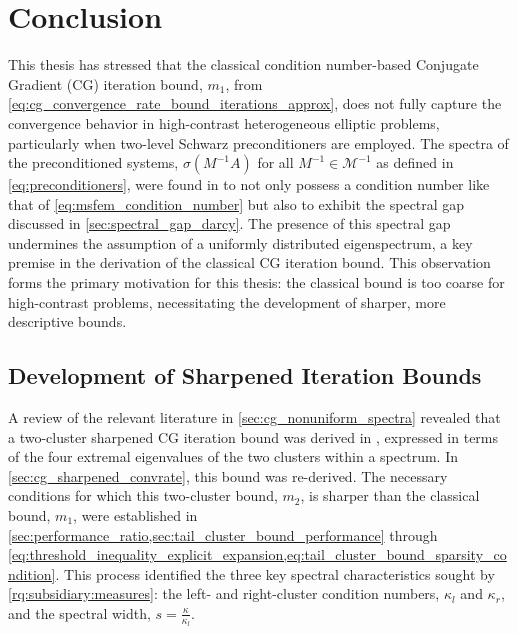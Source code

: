 \chapter{Conclusion}\label{ch:conclusion}
This thesis has stressed that the classical condition number-based Conjugate Gradient (CG) iteration bound, $m_1$, from \cref{eq:cg_convergence_rate_bound_iterations_approx}, does not fully capture the convergence behavior in high-contrast heterogeneous elliptic problems, particularly when two-level Schwarz preconditioners are employed. The spectra of the preconditioned systems, $\sigma(M^{-1}A)$ for all $M^{-1}\in\mathcal{M}^{-1}$ as defined in \cref{eq:preconditioners}, were found in \cite{ams_coarse_space_comp_study_Alves2024} to not only possess a condition number like that of \cref{eq:msfem_condition_number} but also to exhibit the spectral gap discussed in \cref{sec:spectral_gap_darcy}. The presence of this spectral gap undermines the assumption of a uniformly distributed eigenspectrum, a key premise in the derivation of the classical CG iteration bound. This observation forms the primary motivation for this thesis: the classical bound is too coarse for high-contrast problems, necessitating the development of sharper, more descriptive bounds.

\section{Development of Sharpened Iteration Bounds}
A review of the relevant literature in \cref{sec:cg_nonuniform_spectra} revealed that a two-cluster sharpened CG iteration bound was derived in \cite[Section 4]{cg_sharpened_convrate_Axelsson1976}, expressed in terms of the four extremal eigenvalues of the two clusters within a spectrum. In \cref{sec:cg_sharpened_convrate}, this bound was re-derived. The necessary conditions for which this two-cluster bound, $m_2$, is sharper than the classical bound, $m_1$, were established in \cref{sec:performance_ratio,sec:tail_cluster_bound_performance} through \cref{eq:threshold_inequality_explicit_expansion,eq:tail_cluster_bound_sparsity_condition}. This process identified the three key spectral characteristics sought by \ref{rq:subsidiary:measures}: the left- and right-cluster condition numbers, $\kappa_l$ and $\kappa_r$, and the spectral width, $s = \frac{\kappa}{\kappa_l}$.


